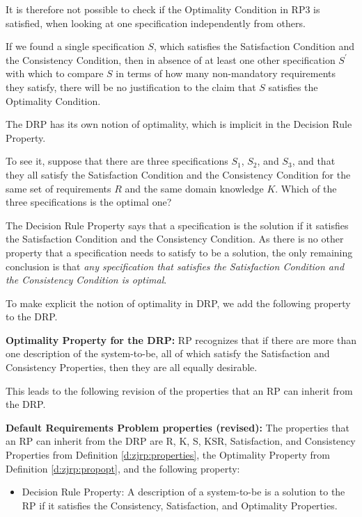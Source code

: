 \documentclass[graybox]{svmult}
\newcommand{\zi}[1]{\textit{#1}}
\newcommand{\xb}[1]{\textbf{#1}}
\newcommand{\xf}[1]{\textsf{#1}}
\newcommand{\RPfull}{Requirements Problem}
\newcommand{\RP}{RP}
\newcommand{\ZJRPfull}{Default \RPfull}
\newcommand{\ZJRP}{DRP}
\newcommand{\SatisfactionCondition}{Satisfaction Condition}
\newcommand{\ConsistencyCondition}{Consistency Condition}
\newcommand{\OptimalityCondition}{Optimality Condition}
\newcommand{\PrR}{\xf{R}}
\newcommand{\PrK}{\xf{K}}
\newcommand{\PrS}{\xf{S}}
\newcommand{\PrKSR}{\xf{KSR}}
\newcommand{\PrSatisfaction}{\xf{Satisfaction}}
\newcommand{\PrConsistency}{\xf{Consistency}}
\newcommand{\PrDR}{\xf{Decision Rule}}
\newcommand{\PrOpt}{\xf{Optimality}}
\newcommand{\PropDR}{\PrDR{} Property}
\newcommand{\PropOpt}{\xf{Optimality Property}}
\begin{document}
It is therefore not possible to check if the \OptimalityCondition{} in RP3 is satisfied, when looking at one specification independently from others.

If we found a single specification $S$, which satisfies the \SatisfactionCondition{} and the \ConsistencyCondition, then in absence of at least one other specification $S^{\prime}$ with which to compare $S$ in terms of how many non-mandatory requirements they satisfy, there will be no justification to the claim that $S$ satisfies the \OptimalityCondition.

The \ZJRP{} has its own notion of optimality, which is implicit in the \PropDR. 

To see it, suppose that there are three specifications $S_{1}$, $S_{2}$, and $S_{3}$, and that they all satisfy the \SatisfactionCondition{} and the \ConsistencyCondition{} for the same set of requirements $R$ and the same domain knowledge $K$. Which of the three specifications is the optimal one?

The \PropDR{} says that a specification is the solution if it satisfies the \SatisfactionCondition{} and the \ConsistencyCondition. As there is no other property that a specification needs to satisfy to be a solution, the only remaining conclusion is that \zi{any specification that satisfies the \SatisfactionCondition{} and the \ConsistencyCondition{} is optimal}.

To make explicit the notion of optimality in \ZJRP, we add the following property to the \ZJRP.

\begin{definition}\label{d:zjrp:propopt}
\xb{\PropOpt{} for the \ZJRP:} \RP{} recognizes that if there are more than one description of the system-to-be, all of which satisfy the \PrSatisfaction{} and \PrConsistency{} Properties, then they are all equally desirable.
\end{definition}

This leads to the following revision of the properties that an \RP{} can inherit from the \ZJRP.

\begin{definition}\label{d:zjrp:properties-revised}
\xb{\ZJRPfull{} properties (revised):} The properties that an \RP{} can inherit from the \ZJRP{} are \PrR, \PrK, \PrS, \PrKSR, \PrSatisfaction, and \PrConsistency{} Properties from Definition \ref{d:zjrp:properties}, the \PropOpt{} from Definition \ref{d:zjrp:propopt}, and the following property:
\begin{itemize}
    \item{\PropDR: A description of a system-to-be is a solution to the \RP{} if it satisfies the \PrConsistency, \PrSatisfaction, and \PrOpt{} Properties.}
\end{itemize}
\end{definition}
\end{document}
